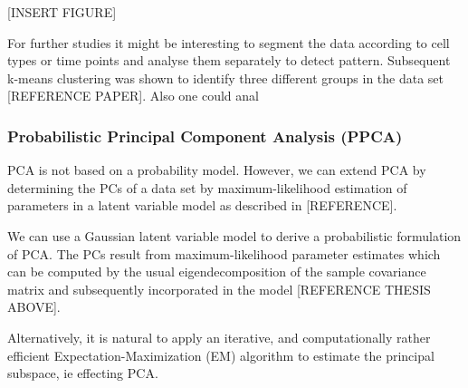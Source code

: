 \documentclass[journal, a4paper]{IEEEtran}
\begin{document}


[INSERT FIGURE]

For further studies it might be interesting to segment the data according to cell types or time points and analyse them separately to detect pattern. Subsequent k-means clustering was shown to identify three different groups in the data set [REFERENCE PAPER].
Also one could anal



\hfill
\subsubsection{Probabilistic Principal Component Analysis (PPCA)}

PCA is not based on a probability model. However, we can extend PCA by determining the PCs of a data set by maximum-likelihood estimation of parameters in a latent variable model as described in [REFERENCE].

We can use a Gaussian latent variable model %
to derive a probabilistic formulation of PCA. The PCs result from maximum-likelihood parameter estimates which can be computed by the usual eigendecomposition of the sample covariance matrix and subsequently incorporated in the model [REFERENCE THESIS ABOVE]. 

Alternatively, it is natural to apply an iterative, and computationally rather efficient Expectation-Maximization (EM) algorithm to estimate the principal subspace, ie effecting PCA.

\end{document}
